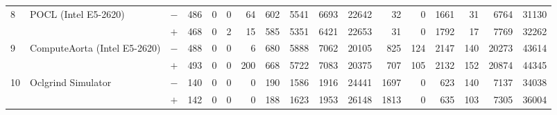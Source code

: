 \begin{tabular}{lll | rrrrrrr | rrrrrrr }
\hline
\multirow{ 2}{*}{8} & \multirow{ 2}{*}{POCL (Intel E5-2620)} & $-$ & 486 & 0 & 0 & 64 & 602 & 5541 & 6693       & 22642 & 32 & 0 & 1661 & 31 & 6764 & 31130 \\& & $+$ & 468 & 0 & 2 & 15 & 585 & 5351 & 6421 & 22653 & 31 & 0 & 1792 & 17 & 7769 & 32262 \\
\hline
\multirow{ 2}{*}{9} & \multirow{ 2}{*}{ComputeAorta (Intel E5-2620)} & $-$ & 488 & 0 & 0 & 6 & 680 & 5888 & 7062       & 20105 & 825 & 124 & 2147 & 140 & 20273 & 43614 \\& & $+$ & 493 & 0 & 0 & 200 & 668 & 5722 & 7083 & 20375 & 707 & 105 & 2132 & 152 & 20874 & 44345 \\
\hline
\multirow{ 2}{*}{10} & \multirow{ 2}{*}{Oclgrind Simulator} & $-$ & 140 & 0 & 0 & 0 & 190 & 1586 & 1916       & 24441 & 1697 & 0 & 623 & 140 & 7137 & 34038 \\& & $+$ & 142 & 0 & 0 & 0 & 188 & 1623 & 1953 & 26148 & 1813 & 0 & 635 & 103 & 7305 & 36004 \\
  \bottomrule
\end{tabular}

